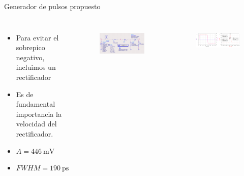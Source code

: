 \documentclass{beamer}
\begin{document}
\begin{frame}{Generador de pulsos propuesto}

    \begin{columns}[c]
        \begin{itemize}
            \item Para evitar el sobrepico negativo, incluimos un rectificador
            \item Es de fundamental importancia la velocidad del rectificador.
            \item $A = \qty{446}{\milli\volt}$
            \item $FWHM = \qty{190}{\pico\second}$
        \end{itemize}
        \begin{figure}[t!]
            \centering
            \includegraphics[width=\textwidth]{images/pulser_w_schottky_sch.png}
            \label{fig:pulser_w_schottky_sch}
        \end{figure}

        \begin{figure}[t!]
            \centering
            \includegraphics[width=\textwidth]{images/pulser_w_schottky_sim_result.png}
            \label{fig:pulser_w_schottky_sim_result}
        \end{figure}

    \end{columns}

\end{frame}
\end{document}

